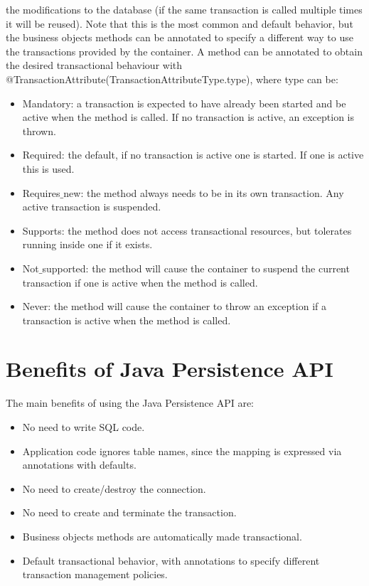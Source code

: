 \documentclass[12pt, a4paper]{report}
\begin{document}
    the modifications to the database (if the same transaction is called multiple times it will be reused). Note that this is the most common and default behavior, but 
    the business objects methods can be annotated to specify a different way to use the transactions provided by the container. A method can be annotated to obtain the 
    desired transactional behaviour with @TransactionAttribute(TransactionAttributeType.type), where type can be: 
    \begin{itemize}
        \item Mandatory: a transaction is expected to have already been started and be active when the method is called. If no transaction is active, an exception is thrown.
        \item Required: the default, if no transaction is active one is started. If one is active this is used.
        \item Requires$\_$new: the method always needs to be in its own transaction. Any active transaction is suspended. 
        \item Supports: the method does not access transactional resources, but tolerates running inside one if it exists.
        \item Not$\_$supported: the method will cause the container to suspend the current transaction if one is active when the method is called. 
        \item Never: the method will cause the container to throw an exception if a transaction is active when the method is called.
    \end{itemize}

    \section{Benefits of Java Persistence API}
    The main benefits of using the Java Persistence API are: 
    \begin{itemize}
        \item No need to write SQL code.
        \item Application code ignores table names, since the mapping is expressed via annotations with defaults. 
        \item No need to create/destroy the connection. 
        \item No need to create and terminate the transaction. 
        \item Business objects methods are automatically made transactional. 
        \item Default transactional behavior, with annotations to specify different transaction management policies. 
    \end{itemize}
\end{document}
